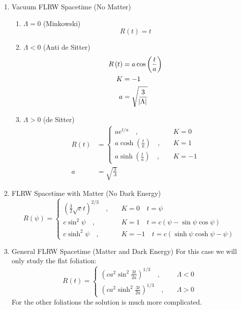 \documentclass[preprint,notitlepage,amsmath,amssymb,floatfix]{revtex4-1}
\begin{document}
\begin{enumerate}
  \item Vacuum FLRW Spacetime (No Matter)
  \begin{enumerate}
    \item $\Lambda = 0$ (Minkowski)
    \begin{equation}
    R\left(t\right) = t
    \end{equation}
    \item $\Lambda < 0$ (Anti de Sitter)
    \begin{equation}
    \begin{split}
    R\left(t\right) &= a\cos\left(\frac{t}{a}\right) \\
    K &= -1 \\
    a &= \sqrt{\frac{3}{\abs{\Lambda}}}
    \end{split}
    \end{equation}
    \item $\Lambda > 0$ (de Sitter)
    \begin{equation}
    \begin{split}
    R\left(t\right) &= 
    \begin{cases}
      ae^{t/a}\quad,  & \quad K = 0 \\
      a\cosh\left(\frac{t}{a}\right)\quad, & \quad K = 1 \\
      a\sinh\left(\frac{t}{a}\right)\quad, & \quad K = -1
    \end{cases} \\
    a &= \sqrt{\frac{3}{\Lambda}}
    \end{split}
    \end{equation}
  \end{enumerate}

  \item FLRW Spacetime with Matter (No Dark Energy)
  \begin{equation}
  R\left(\psi\right) = 
  \begin{cases}
    \left(\frac{3}{2}\sqrt{c}t\right)^{2/3}\quad, & \quad K = 0 \quad t = \psi \\
    c\sin^2\psi\quad, & \quad K = 1 \quad t = c\left(\psi - \sin\psi\cos\psi\right) \\
    c\sinh^2\psi\quad, & \quad K = -1 \quad t = c\left(\sinh\psi\cosh\psi - \psi\right)
  \end{cases}
  \end{equation}

  \item General FLRW Spacetime (Matter and Dark Energy)
  For this case we will only study the flat foliation:
  \begin{equation}
  \label{eq:scale_factor_derivation}
  R\left(t\right) = 
  \begin{cases}
    \left(c a^2\sin^2\frac{3t}{2a}\right)^{1/3}\quad, & \quad \Lambda < 0 \\
    \left(c a^2\sinh^2\frac{3t}{2a}\right)^{1/3}\quad, & \quad \Lambda > 0
  \end{cases}
  \end{equation}
  For the other foliations the solution is much more complicated.
\end{enumerate}
\end{document}
